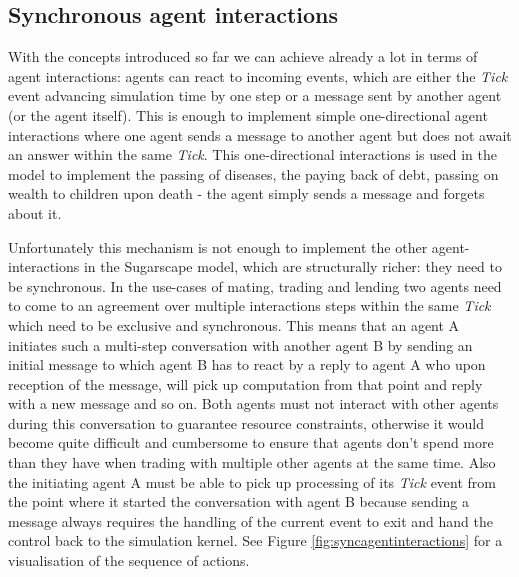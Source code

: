 \subsection{Synchronous agent interactions}
With the concepts introduced so far we can achieve already a lot in terms of agent interactions: agents can react to incoming events, which are either the \textit{Tick} event advancing simulation time by one step or a message sent by another agent (or the agent itself). This is enough to implement simple one-directional agent interactions where one agent sends a message to another agent but does not await an answer within the same \textit{Tick}. This one-directional interactions is used in the model to implement the passing of diseases, the paying back of debt, passing on wealth to children upon death - the agent simply sends a message and forgets about it.

Unfortunately this mechanism is not enough to implement the other agent-interactions in the Sugarscape model, which are structurally richer: they need to be synchronous. In the use-cases of mating, trading and lending two agents need to come to an agreement over multiple interactions steps within the same \textit{Tick} which need to be exclusive and synchronous.  This means that an agent A initiates such a multi-step conversation with another agent B by sending an initial message to which agent B has to react by a reply to agent A who upon reception of the message, will pick up computation from that point and reply with a new message and so on. Both agents must not interact with other agents during this conversation to guarantee resource constraints, otherwise it would become quite difficult and cumbersome to ensure that agents don't spend more than they have when trading with multiple other agents at the same time. Also the initiating agent A must be able to pick up processing of its \textit{Tick} event from the point where it started the conversation with agent B because sending a message always requires the handling of the current event to exit and hand the control back to the simulation kernel. See Figure \ref{fig:syncagentinteractions} for a visualisation of the sequence of actions.


